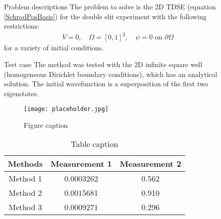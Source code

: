 \documentclass[final]{beamer}
\newlength{\sepwid}
\newlength{\onecolwid}
\newlength{\twocolwid}
\begin{document}
\begin{frame}[t]
\begin{columns}[t]
\begin{column}{\onecolwid}
\end{column} %

\begin{column}{\sepwid}\end{column} %

\begin{column}{\twocolwid} %

\begin{columns}[t,totalwidth=\twocolwid] %

\begin{column}{\onecolwid}\vspace{-.6in} %

\begin{block}{Problem descriptions}
The problem to solve is the 2D TDSE (equation \eqref{SchrodPosBasis}) for the double slit experiment with the following restrictions:
	\begin{gather}
	V=0,\quad\Omega=\left[0,1\right]^{2},\quad\psi = 0\text{ on } \partial\Omega
	\end{gather}
	for a variety of initial conditions.
\end{block}
\begin{block}{Test case}
The method was tested with the 2D infinite square well (homogeneous Dirichlet boundary conditions), which has an analytical solution. The initial wavefunction is a superposition of the first two eigenstates.

\begin{figure}[H]
\texttt{[image: placeholder.jpg]}
\caption{Figure caption}
\end{figure}
\begin{table}[H]
	\begin{tabular}{c c c}
		\toprule
		\textbf{Methods} & \textbf{Measurement 1} & \textbf{Measurement 2}\\
		\midrule
		Method 1 & 0.0003262 & 0.562 \\
		Method 2 & 0.0015681 & 0.910 \\
		Method 3 & 0.0009271 & 0.296 \\
		\bottomrule
	\end{tabular}
	\caption{Table caption}
\end{table}


\end{block}
\end{column}
\end{columns}
\end{column}
\end{columns}
\end{frame}
\end{document}
